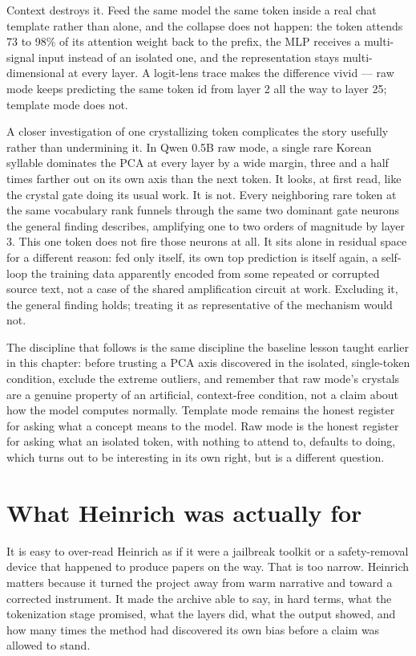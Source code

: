 \documentclass[11pt,oneside]{book}
\begin{document}
Context destroys it. Feed the same model the same token inside a real chat template rather than alone, and the collapse does not happen: the token attends 73 to 98\% of its attention weight back to the prefix, the MLP receives a multi-signal input instead of an isolated one, and the representation stays multi-dimensional at every layer. A logit-lens trace makes the difference vivid --- raw mode keeps predicting the same token id from layer 2 all the way to layer 25; template mode does not.

A closer investigation of one crystallizing token complicates the story usefully rather than undermining it. In Qwen 0.5B raw mode, a single rare Korean syllable dominates the PCA at every layer by a wide margin, three and a half times farther out on its own axis than the next token. It looks, at first read, like the crystal gate doing its usual work. It is not. Every neighboring rare token at the same vocabulary rank funnels through the same two dominant gate neurons the general finding describes, amplifying one to two orders of magnitude by layer 3. This one token does not fire those neurons at all. It sits alone in residual space for a different reason: fed only itself, its own top prediction is itself again, a self-loop the training data apparently encoded from some repeated or corrupted source text, not a case of the shared amplification circuit at work. Excluding it, the general finding holds; treating it as representative of the mechanism would not.

The discipline that follows is the same discipline the baseline lesson taught earlier in this chapter: before trusting a PCA axis discovered in the isolated, single-token condition, exclude the extreme outliers, and remember that raw mode's crystals are a genuine property of an artificial, context-free condition, not a claim about how the model computes normally. Template mode remains the honest register for asking what a concept means to the model. Raw mode is the honest register for asking what an isolated token, with nothing to attend to, defaults to doing, which turns out to be interesting in its own right, but is a different question.

\section{What Heinrich was actually for}
It is easy to over-read Heinrich as if it were a jailbreak toolkit or a safety-removal device that happened to produce papers on the way. That is too narrow. Heinrich matters because it turned the project away from warm narrative and toward a corrected instrument. It made the archive able to say, in hard terms, what the tokenization stage promised, what the layers did, what the output showed, and how many times the method had discovered its own bias before a claim was allowed to stand.
\end{document}
